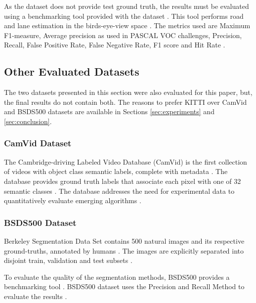 \documentclass[10pt,twocolumn,letterpaper]{article}
\begin{document}
As the dataset does not provide test ground truth, the results must be evaluated using a benchmarking tool provided with the dataset \cite{KITTI_WEBSITE}. This tool  performs road and lane estimation in the birds-eye-view space \cite{KITTI} \cite{KITTI_WEBSITE}. The metrics used are Maximum F1-measure, Average precision as used in PASCAL VOC challenges, Precision, Recall, False Positive Rate, False Negative Rate, F1 score and Hit Rate \cite{KITTI} \cite{KITTI_WEBSITE}.

\subsection{Other Evaluated Datasets} \label{ssec:other_datasets}

The two datasets presented in this section were also evaluated for this paper, but, the final results do not contain both. The reasons to prefer KITTI over CamVid and BSDS500 datasets are available in Sections \ref{sec:experiments} and \ref{sec:conclusion}.

\subsubsection{CamVid Dataset} \label{sssec:camvid_datasets}

The Cambridge-driving Labeled Video Database (CamVid) is the first collection of videos with object class semantic labels, complete with metadata \cite{CAMVID}. The database provides ground truth labels that associate each pixel with one of 32 semantic classes \cite{CAMVID}. The database addresses the need for experimental data to quantitatively evaluate emerging algorithms \cite{CAMVID}.

\subsubsection{BSDS500 Dataset} \label{sssec:bsds_dataset}

Berkeley Segmentation Data Set contains 500 natural images and its respective ground-truths, annotated by humans \cite{BSDS500}. The images are explicitly separated into disjoint train, validation and test subsets \cite{BSDS500}.

To evaluate the quality of the segmentation methods, BSDS500 provides a benchmarking tool \cite{BSDS500}. BSDS500 dataset uses the Precision and Recall Method to evaluate the results \cite{BSDS500}.
\end{document}
